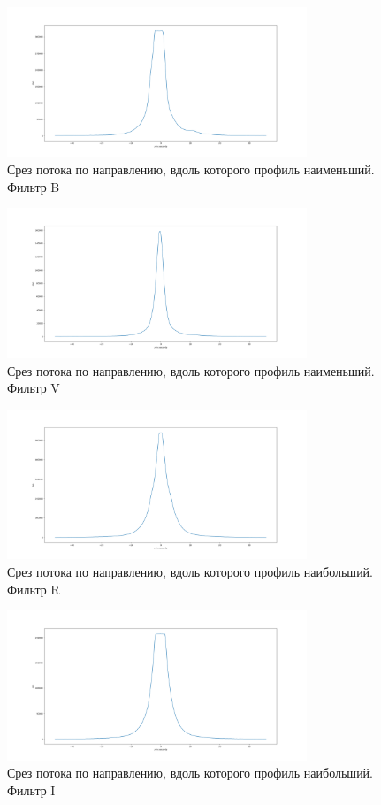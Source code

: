\documentclass [12pt, a4paper] {article}
\theoremstyle{definition}
\begin{document}
		\begin{figure}
		\centering
			\includegraphics[width = 0.8\textwidth]{B_slice_min.png}
						\caption{Срез потока по направлению, вдоль которого профиль наименьший. Фильтр B}
					\end{figure}
		\begin{figure}
		\centering
			\includegraphics[width = 0.8\textwidth]{V_slice_min.png}
			\caption{Срез потока по направлению, вдоль которого профиль наименьший. Фильтр V}
\end{figure}
\begin{figure}
		\centering
			\includegraphics[width = 0.8\textwidth]{R_slice_max.png}
			\caption{Срез потока по направлению, вдоль которого профиль наибольший. Фильтр R}
		\end{figure}
		\begin{figure}
		\centering
			\includegraphics[width = 0.8\textwidth]{I_slice_max.png}
						\caption{Срез потока по направлению, вдоль которого профиль наибольший. Фильтр I}
		\end{figure}
\end{document}
